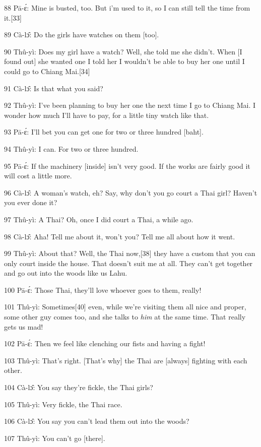 {88 Pā-ɛ́: Mine is busted, too. But i'm used to it, so I can still tell
the time from it.[33]}

{89 Cà-lɔ̂: Do the girls have watches on them [too].}

{90 Thû-yì: Does my girl have a watch? Well, she told me she didn't. When
[I found out] she wanted one I told her I wouldn't be able to buy her one until
I could go to Chiang Mai.[34]}

{91 Cà-lɔ̂: Is that what you said?}

{92 Thû-yì: I've been planning to buy her one the next time I go to Chiang
Mai. I wonder how much I'll have to pay, for a little tiny watch like that.}

{93 Pā-ɛ́: I'll bet you can get one for two or three hundred [baht].}

{94 Thû-yì: I can. For two or three hundred.}

{95 Pā-ɛ́: If the machinery [inside] isn't very good. If the works are
fairly good it will cost a little more.}

{96 Cà-lɔ̂: A woman's watch, eh? Say, why don't you go court a Thai girl?
Haven't you ever done it?}

{97 Thû-yì: A Thai? Oh, once I did court a Thai, a while ago.}

{98 Cà-lɔ̂: Aha! Tell me about it, won't you? Tell me all about how it
went.}

{99 Thû-yì: About that? Well, the Thai now,[38] they have a custom that
you can only court inside the house. That doesn't suit me at all. They can't get
together and go out into the woods like us Lahu. }

{100 Pā-ɛ́: Those Thai, they'll love whoever goes to them, really!}

{101 Thû-yì: Sometimes[40] even, while we're visiting them all nice and
proper, some other guy comes too, and she talks to }{\textit{him}}{
at the same time. That really gets us mad!}

{102 Pā-ɛ́: Then we feel like clenching our fists and having a fight!}

{103 Thû-yì: That's right. [That's why] the Thai are [always] fighting
with each other.}

{104 Cà-lɔ̂: You say they're fickle, the Thai girls?}

{105 Thû-yì: Very fickle, the Thai race.}

{106 Cà-lɔ̂: You say you can't lead them out into the woods?}

{107 Thû-yì: You can't go [there].}

